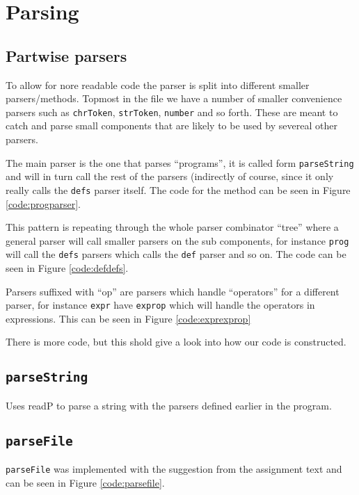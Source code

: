 \section{Parsing}

\subsection{Partwise parsers}
To allow for nore readable code the parser is split into different smaller
parsers/methods. Topmost in the file we have a number of smaller convenience
parsers such as \texttt{chrToken}, \texttt{strToken}, \texttt{number} and so
forth. These are meant to catch and parse small components that are likely to be
used by severeal other parsers.

The main parser is the one that parses ``programs'', it is called form
\texttt{parseString} and will in turn call the rest of the parsers (indirectly
of course, since it only really calls the \texttt{defs} parser itself. The code
for the method can be seen in Figure \ref{code:progparser}.


This pattern is repeating through the whole parser combinator ``tree'' where a
general parser will call smaller parsers on the sub components, for instance
\texttt{prog} will call the \texttt{defs} parsers which calls the \texttt{def}
parser and so on. The code can be seen in Figure \ref{code:defdefs}.



Parsers suffixed with ``op'' are parsers which handle ``operators'' for a
different parser, for instance \texttt{expr} have \texttt{exprop} which will
handle the operators in expressions. This can be seen in Figure
\ref{code:exprexprop}


There is more code, but this shold give a look into how our code is constructed.


\subsection{\texttt{parseString}}
Uses readP to parse a string with the parsers defined earlier in the program.




\subsection{\texttt{parseFile}}
\texttt{parseFile} was implemented with the suggestion from the assignment text
and can be seen in Figure \ref{code:parsefile}.

